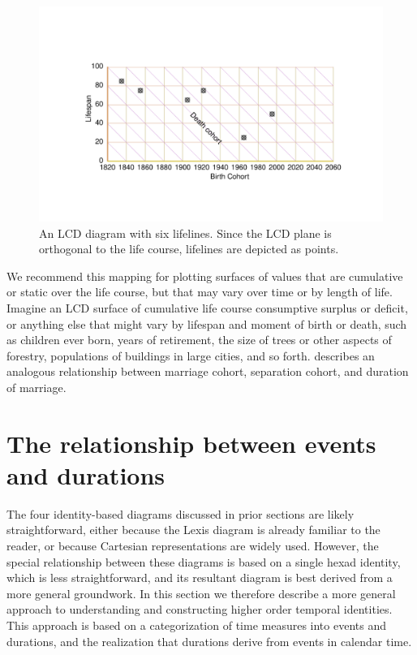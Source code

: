 \documentclass{bmcart}
\theoremstyle{definition}
\begin{document}
\begin{figure}[h!] 
\caption{An LCD diagram with six lifelines. Since the LCD plane is orthogonal
to the life course, lifelines are depicted as points.}
\label{fig:LCD}
\centering
\includegraphics[scale=0.8]{Fig4.pdf}
\end{figure} 

We recommend this mapping for plotting surfaces of values that are cumulative or
static over the life course, but that may vary over time or by length of life.
Imagine an LCD surface of cumulative life course consumptive surplus or deficit,
or anything else that might vary by lifespan and moment of birth or death, such as children ever born, years of retirement, the
size of trees or other aspects of forestry, populations of buildings in large
cities, and so forth. \citet{lexis1875einleitung} describes an analogous
relationship between marriage cohort, separation cohort, and duration of
marriage.

\FloatBarrier

\section{The relationship between events and durations}
\label{sec:gen}
The four identity-based diagrams discussed in prior sections are likely
straightforward, either because the Lexis diagram is already
familiar to the reader, or because Cartesian representations are widely used.
However, the special relationship between these diagrams is based on a single
hexad identity, which is less straightforward, and its resultant
diagram is best derived from a more general groundwork. In this section we therefore describe a more general
approach to understanding and constructing higher order temporal identities.
This approach is based on a categorization of time measures into events and
durations, and the realization that durations derive from events in calendar
time.
\end{document}
